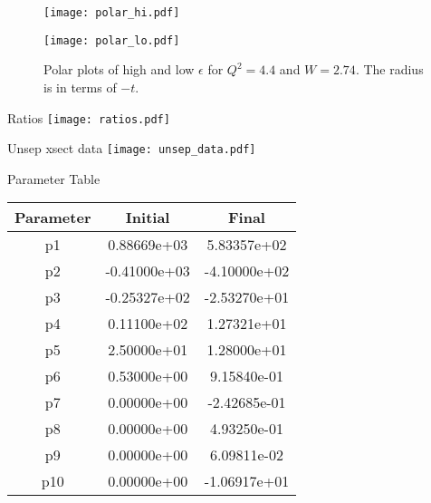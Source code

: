 %
%

\begin{figure}
  \centering
  \begin{minipage}[b]{0.48\linewidth}
    \texttt{[image: polar\_hi.pdf]}
  \end{minipage}
  \hfill
  \begin{minipage}[b]{0.48\linewidth}
    \texttt{[image: polar\_lo.pdf]}
  \end{minipage}
  
  \caption{Polar plots of high and low $\epsilon$ for $Q^2=4.4$ and $W=2.74$. The radius is in terms of $-t$.}
  \label{fig:7-1_polar}
\end{figure}

\begin{Mfigure}{Ratios}
  \centering
  \texttt{[image: ratios.pdf]}
  \caption{Comparison of data to SIMC yield ratios for $Q^2=3.0$, $W=3.14$ for the lowest $t$-bin ($-t=0.215$).}
  \label{fig:7-1_ratios}
\end{Mfigure}

\begin{Mfigure}{Unsep xsect data}
  \centering
  \texttt{[image: unsep\_data.pdf]}
  \caption{Unseparated cross section for $Q^2=3.0$, $W=3.14$ for the lowest $t$-bin (centered at $-t=0.215$). The fit is the unseparated cross section of eqn. \ref{eq:unsep_xsect} which simultaneously fits L, T, LT, and TT.}
  \label{fig:7-1_unsep_data}
\end{Mfigure}

\begin{Mtable}{Parameter Table}
  \centering
  \begin{tabular}{|c|c|c|}
    \hline
    \textbf{Parameter} & \textbf{Initial} & \textbf{Final} \\
    \hline    
    p1 &  0.88669e+03 &   5.83357e+02 \\
    p2 & -0.41000e+03 &  -4.10000e+02 \\
    p3 & -0.25327e+02 &  -2.53270e+01 \\
    p4 &  0.11100e+02 &   1.27321e+01 \\
    p5 &  2.50000e+01 &   1.28000e+01 \\
    p6 &  0.53000e+00 &   9.15840e-01 \\
    p7 &  0.00000e+00 &  -2.42685e-01 \\
    p8 &  0.00000e+00 &   4.93250e-01 \\
    p9 &  0.00000e+00 &   6.09811e-02 \\
    p10 & 0.00000e+00 &  -1.06917e+01 \\
    \hline
    \end{tabular}
  \caption{Result of iterated fit parameters from eqns \ref{eq:model_sig_l}-\ref{eq:model_sig_tt}. Convergence was achieved in 3 iterations.}
  \label{tab:7-1_sig_params}
\end{Mtable}

